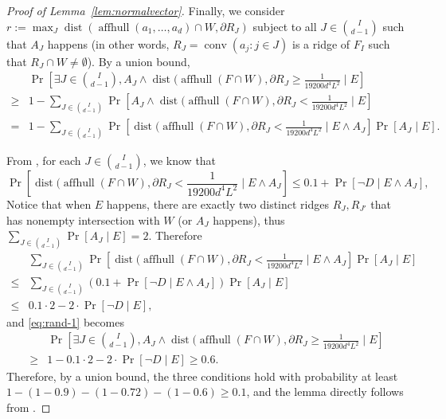 \documentclass{article}\usepackage[a4paper,margin=20mm]{geometry}
\newcommand{\aff}{\operatorname{affhull}}
\newcommand{\conv}{\operatorname{conv}}
\newcommand{\dist}{\operatorname{dist}}
\begin{document}
\begin{proof}[Proof of Lemma~\ref{lem:normalvector}]
    Finally, we consider $r := \max_{J} \dist(\aff(a_1, \ldots, a_d) \cap W, \partial R_J)$ subject to all $J \in \binom{I}{d-1}$ such that $A_J$ happens (in other words, $R_J = \conv(a_j : j \in J)$ is a ridge of $F_I$ such that $R_J \cap W \neq \emptyset$). By a union bound,
    \begin{align}\label{eq:rand-1}
        & \Pr\left[ \exists J \in \binom{I}{d-1}, A_J \wedge \dist(\aff(F \cap W), \partial R_J \geq \frac{1}{19200d^4L^2} \mid E \right] \nonumber \\
        \geq & 1 - \sum_{J \in \binom{I}{d-1}} \Pr[ A_J \wedge \dist(\aff(F \cap W), \partial R_{J} < \frac{1}{19200d^4L^2} \mid E ] \nonumber \\
        = & 1 - \sum_{J \in \binom{I}{d-1}} \Pr[ \dist(\aff(F \cap W), \partial R_{J} < \frac{1}{19200d^4L^2} \mid E \wedge A_J ] \Pr[A_J \mid E ] .
    \end{align}

    From , for each $J \in \binom{I}{d-1}$, we know that
    \[
        \Pr[\dist(\aff(F \cap W), \partial R_J < \frac{1}{19200d^4L^2} \mid E \wedge A_J ]
        \leq 0.1 + \Pr[\neg D \mid E \wedge A_J],
    \]
    Notice that when $E$ happens, there are exactly two distinct ridges $R_{J}, R_{J'}$ that has nonempty intersection with $W$ (or $A_J$ happens), thus $\sum_{J \in \binom{I}{d-1}} \Pr[A_J \mid E] = 2$.
    Therefore
    \begin{align*}
        &  \sum_{J \in \binom{I}{d-1}} \Pr[ \dist(\aff(F \cap W), \partial R_{J} < \frac{1}{19200d^4L^2} \mid E \wedge A_J ] \Pr[A_J \mid E ] \\
        \leq &  \sum_{J \in \binom{I}{d-1}} (0.1 +  \Pr[\neg D \mid E \wedge A_J])\Pr[A_J \mid E ] \\
        \leq &  0.1 \cdot 2 - 2\cdot\Pr[\neg D \mid E] ,
    \end{align*}
    and \eqref{eq:rand-1} becomes
    \begin{align*}
        & \Pr\left[ \exists J \in \binom{I}{d-1}, A_J \wedge \dist(\aff(F \cap W), \partial R_J \geq \frac{1}{19200d^4L^2} \mid E  \right]  \\
        \geq & 1 - 0.1 \cdot 2 - 2\cdot\Pr[\neg D \mid E] \geq 0.6 .
    \end{align*}
    Therefore, by a union bound, the three conditions hold with probability at least $1 - (1 - 0.9) - (1 - 0.72) - (1 - 0.6) \geq 0.1$, and the lemma directly follows from .
\end{proof}
\end{document}
